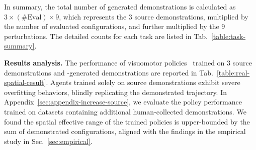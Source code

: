 In summary, the total number of generated demonstrations is calculated as $3 \times (\mathrm{\# Eval}) \times 9$, which represents the $3$ source demonstrations, multiplied by the number of evaluated configurations, and further multiplied by the $9$ perturbations. The detailed counts for each task are listed in Tab.~\ref{table:task-summary}.















\vspace{0.2cm} \noindent\textbf{Results analysis.}
The performance of visuomotor policies~\cite{ze20243d} trained on $3$ source demonstrations and \method-generated demonstrations are reported in Tab.~\ref{table:real-spatial-result}. Agents trained solely on source demonstrations exhibit severe overfitting behaviors, blindly replicating the demonstrated trajectory. 
In Appendix~\ref{sec:appendix-increase-source}, we evaluate the policy performance trained on datasets containing additional human-collected demonstrations. We found the spatial effective range of the trained policies is upper-bounded by the sum of demonstrated configurations, aligned with the findings in the empirical study in Sec.~\ref{sec:empirical}.



